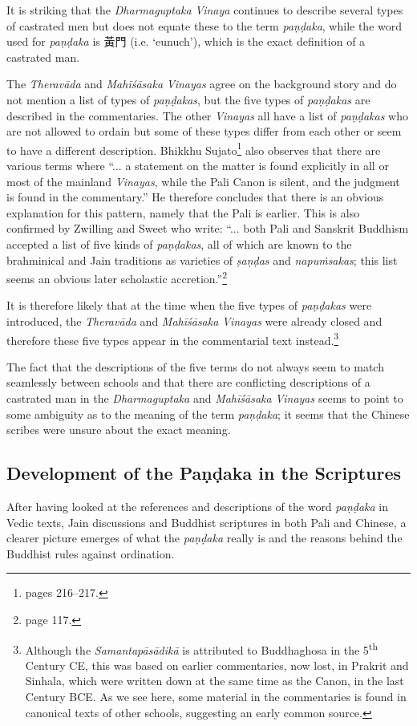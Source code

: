 It is striking that the {\em Dharmaguptaka} {\em Vinaya} continues to describe several types of castrated men but does not equate these to the term {\em paṇḍaka}, while the word used for {\em paṇḍaka} is 黃門 (i.e. `eunuch'), which is the exact definition of a castrated man.

The {\em Theravāda} and {\em Mahīśāsaka} {\em Vinayas} agree on the background story and do not mention a list of types of {\em paṇḍakas}, but the five types of {\em paṇḍakas} are described in the commentaries. The other {\em Vinayas} all have a list of {\em paṇḍakas} who are not allowed to ordain but some of these types differ from each other or seem to have a different description. Bhikkhu Sujato\footnote{\cite{sujato2009} pages 216–217.} also observes that there are various terms where ``... a statement on the matter is found explicitly in all or most of the mainland {\em Vinayas}, while the Pali Canon is silent, and the judgment is found in the commentary.'' He therefore concludes that there is an obvious explanation for this pattern, namely that the Pali is earlier. This is also confirmed by Zwilling and Sweet who write: ``... both Pali and Sanskrit Buddhism accepted a list of five kinds of {\em paṇḍakas}, all of which are known to the brahminical and Jain traditions as varieties of {\em ṣaṇḍas} and {\em napuṁsakas}; this list seems an obvious later scholastic accretion.''\footnote{\cite{zwilling2000} page 117.}

It is therefore likely that at the time when the five types of {\em paṇḍakas} were introduced, the {\em Theravāda} and {\em Mahīśāsaka} {\em Vinayas} were already closed and therefore these five types appear in the commentarial text instead.\footnote{Although the {\em Samantapāsādikā} is attributed to Buddhaghosa in the 5\textsuperscript{th} Century CE, this was based on earlier commentaries, now lost, in Prakrit and Sinhala, which were written down at the same time as the Canon, in the last Century BCE. As we see here, some material in the commentaries is found in canonical texts of other schools, suggesting an early common source.} 

The fact that the descriptions of the five terms do not always seem to match seamlessly between schools and that there are conflicting descriptions of a castrated man in the {\em Dharmaguptaka} and {\em Mahīśāsaka} {\em Vinayas} seems to point to some ambiguity as to the meaning of the term {\em paṇḍaka}; it seems that the Chinese scribes were unsure about the exact meaning.


\subsection{Development of the Paṇḍaka in the Scriptures}
After having looked at the references and descriptions of the word {\em paṇḍaka} in Vedic texts, Jain discussions and Buddhist scriptures in both Pali and Chinese, a clearer picture emerges of what the {\em paṇḍaka} really is and the reasons behind the Buddhist rules against ordination.

